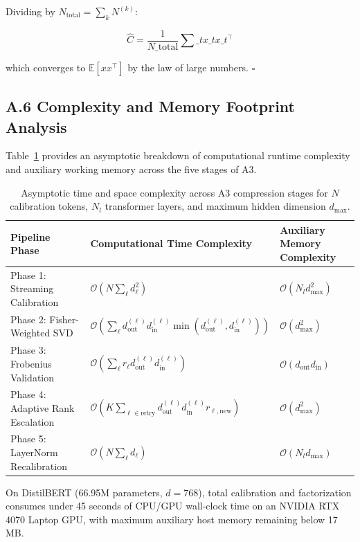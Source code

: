 Dividing by $N_\text{total} = \sum_k N^{(k)}$:

\[
\hat{C} = \frac{1}{N\_\text{total}} \sum\_t x\_t x\_t^\top
\tag{A.15}
\]

which converges to $\mathbb{E}[x x^\top]$ by the law of large numbers. $\square$

\subsection{A.6 Complexity and Memory Footprint Analysis}
\label{sec:app_complexity}

Table~\ref{tab:complexity_analysis} provides an asymptotic breakdown of computational runtime complexity and auxiliary working memory across the five stages of A3.

\begin{table}[H]
\centering
\small
\begin{tabular}{lll}
\toprule
\textbf{Pipeline Phase} & \textbf{Computational Time Complexity} & \textbf{Auxiliary Memory Complexity} \\
\midrule
Phase 1: Streaming Calibration & $\mathcal{O}(N \sum_\ell d_\ell^2)$ & $\mathcal{O}(N_l d_\text{max}^2)$ \\
Phase 2: Fisher-Weighted SVD & $\mathcal{O}(\sum_\ell d_\text{out}^{(\ell)} d_\text{in}^{(\ell)} \min(d_\text{out}^{(\ell)}, d_\text{in}^{(\ell)}))$ & $\mathcal{O}(d_\text{max}^2)$ \\
Phase 3: Frobenius Validation & $\mathcal{O}(\sum_\ell r_\ell d_\text{out}^{(\ell)} d_\text{in}^{(\ell)})$ & $\mathcal{O}(d_\text{out} d_\text{in})$ \\
Phase 4: Adaptive Rank Escalation & $\mathcal{O}(K \sum_{\ell \in \text{retry}} d_\text{out}^{(\ell)} d_\text{in}^{(\ell)} r_{\ell,\text{new}})$ & $\mathcal{O}(d_\text{max}^2)$ \\
Phase 5: LayerNorm Recalibration & $\mathcal{O}(N \sum_\ell d_\ell)$ & $\mathcal{O}(N_l d_\text{max})$ \\
\bottomrule
\end{tabular}
\caption{Asymptotic time and space complexity across A3 compression stages for $N$ calibration tokens, $N_l$ transformer layers, and maximum hidden dimension $d_\text{max}$.}
\label{tab:complexity_analysis}
\end{table}

On DistilBERT (66.95M parameters, $d=768$), total calibration and factorization consumes under 45 seconds of CPU/GPU wall-clock time on an NVIDIA RTX 4070 Laptop GPU, with maximum auxiliary host memory remaining below 17 MB.

